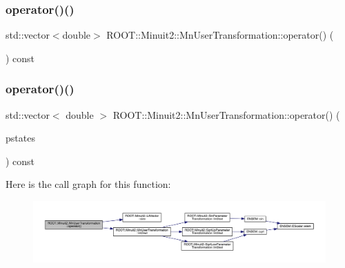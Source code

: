 \subsubsection{\texorpdfstring{operator()()}{operator()()}\hspace{0.1cm}{\footnotesize\ttfamily [2/3]}}
{\footnotesize\ttfamily std\+::vector$<$double$>$ R\+O\+O\+T\+::\+Minuit2\+::\+Mn\+User\+Transformation\+::operator() (\begin{DoxyParamCaption}\item[{const \mbox{\hyperlink{namespaceROOT_1_1Minuit2_a62ed97730a1ca8d3fbaec64a19aa11c9}{Mn\+Algebraic\+Vector}} \&}]{ }\end{DoxyParamCaption}) const}

\mbox{\label{classROOT_1_1Minuit2_1_1MnUserTransformation_a5b4f45e11a5497d548e4b3e9dec95c6d}} 
\subsubsection{\texorpdfstring{operator()()}{operator()()}\hspace{0.1cm}{\footnotesize\ttfamily [3/3]}}
{\footnotesize\ttfamily std\+::vector$<$ double $>$ R\+O\+O\+T\+::\+Minuit2\+::\+Mn\+User\+Transformation\+::operator() (\begin{DoxyParamCaption}\item[{const \mbox{\hyperlink{namespaceROOT_1_1Minuit2_a62ed97730a1ca8d3fbaec64a19aa11c9}{Mn\+Algebraic\+Vector}} \&}]{pstates }\end{DoxyParamCaption}) const}

Here is the call graph for this function\+:
\nopagebreak
\begin{figure}[H]
\begin{center}
\leavevmode
\includegraphics[width=350pt]{d9/d98/classROOT_1_1Minuit2_1_1MnUserTransformation_a5b4f45e11a5497d548e4b3e9dec95c6d_cgraph}
\end{center}
\end{figure}
\mbox{\label{classROOT_1_1Minuit2_1_1MnUserTransformation_a54aa66bb6edb8264484b6ece788b903c}} 
